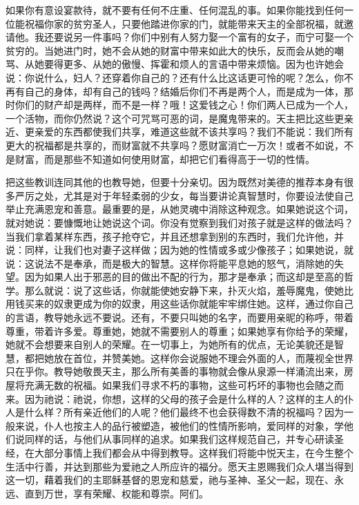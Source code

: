 如果你有意设宴款待，就不要有任何不庄重、任何混乱的事。如果你能找到任何一位能祝福你家的贫穷圣人，只要他踏进你家的门，就能带来天主的全部祝福，就邀请他。我还要说另一件事吗？你们中别有人努力娶一个富有的女子，而宁可娶一个贫穷的。当她进门时，她不会从她的财富中带来如此大的快乐，反而会从她的嘲骂、从她要得更多、从她的傲慢、挥霍和烦人的言语中带来烦恼。因为也许她会说：你说什么，妇人？还穿着你自己的？还有什么比这话更可怜的呢？怎么，你不再有自己的身体，却有自己的钱吗？结婚后你们不再是两个人，而是成为一体，那时你们的财产却是两样，而不是一样？哦！这爱钱之心！你们两人已成为一个人，一个活物，而你仍然说？这个可咒骂可恶的词，是魔鬼带来的。天主把比这些更亲近、更亲爱的东西都使我们共享，难道这些就不该共享吗？我们不能说：我们所有更大的祝福都是共享的，而财富就不共享吗？愿财富消亡一万次！或者不如说，不是财富，而是那些不知道如何使用财富，却把它们看得高于一切的性情。\par

把这些教训连同其他的也教导她，但要十分亲切。因为既然对美德的推荐本身有很多严厉之处，尤其是对于年轻柔弱的少女，每当要讲论真智慧时，你要设法使自己举止充满恩宠和善意。最重要的是，从她灵魂中消除这种观念。如果她说这个词，就对她说：要慷慨地让她说这个词。你没有觉察到我们对孩子就是这样的做法吗？当我们拿着某样东西，孩子抢夺它，并且还想拿到别的东西时，我们允许他，并说：同样，让我们也对妻子这样做；因为她的性情或多或少像孩子；如果她说，就说：这说法不是奉承，而是极大的智慧。这样你将能平息她的怒气，消除她的失望。因为如果人出于邪恶的目的做出不配的行为，那才是奉承；而这却是至高的哲学。那么就说：说了这些话，你就能使她安静下来，扑灭火焰，羞辱魔鬼，使她比用钱买来的奴隶更成为你的奴隶，用这些话你就能牢牢绑住她。这样，通过你自己的言语，教导她永远不要说。还有，不要只叫她的名字，而要用亲昵的称呼，带着尊重，带着许多爱。尊重她，她就不需要别人的尊重；如果她享有你给予的荣耀，她就不会想要来自别人的荣耀。在一切事上，为她所有的优点，无论美貌还是智慧，都把她放在首位，并赞美她。这样你会说服她不理会外面的人，而蔑视全世界只在乎你。教导她敬畏天主，那么所有美善的事物就会像从泉源一样涌流出来，房屋将充满无数的祝福。如果我们寻求不朽的事物，这些可朽坏的事物也会随之而来。因为祂说：祂说，你想，这样的父母的孩子会是什么样的人？这样的主人的仆人是什么样？所有亲近他们的人呢？他们最终不也会获得数不清的祝福吗？因为一般来说，仆人也按主人的品行被塑造，被他们的性情所影响，爱同样的对象，学他们说同样的话，与他们从事同样的追求。如果我们这样规范自己，并专心研读圣经，在大部分事情上我们都会从中得到教导。这样我们将能中悦天主，在今生整个生活中行善，并达到那些为爱祂之人所应许的福分。愿天主恩赐我们众人堪当得到这一切，藉着我们的主耶稣基督的恩宠和慈爱，祂与圣神、圣父一起，现在、永远、直到万世，享有荣耀、权能和尊崇。阿们。\par

